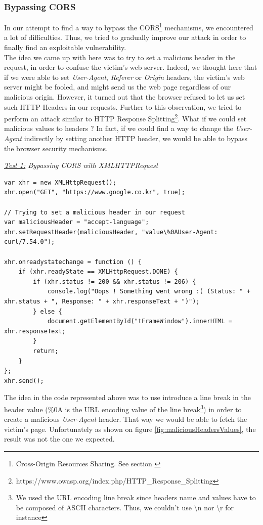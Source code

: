 \documentclass[journal]{IEEEtran}
\begin{document}
\subsubsection*{Bypassing CORS} 

In our attempt to find a way to bypass the CORS\footnote{Cross-Origin Resources Sharing. See section \label{CORSSection}} mechanisms, we encountered a lot of difficulties. Thus, we tried to gradually improve our attack in order to finally find an exploitable vulnerability. \\
The idea we came up with here was to try to set a malicious header in the request, in order to confuse the victim's web server. Indeed, we thought here that if we were able to set \emph{User-Agent}, \emph{Referer} or \emph{Origin} headers, the victim's web server might be fooled, and might send us the web page regardless of our malicious origin. However, it turned out that the browser refused to let us set such HTTP Headers in our requests. Further to this observation, we tried to perform an attack similar to HTTP Response Splitting\footnote{https://www.owasp.org/index.php/HTTP\_Response\_Splitting}. What if we could set malicious values to headers ? In fact, if we could find a way to change the \emph{User-Agent} indirectly by setting another HTTP header, we would be able to bypass the browser security mechanisms.

\medskip

\emph{\underline{Test 1:} Bypassing CORS with XMLHTTPRequest} \\
\begin{lstlisting}[caption=Trying to set malicious headers with XMLHTTPRequest]
var xhr = new XMLHttpRequest();
xhr.open("GET", "https://www.google.co.kr", true);
      
// Trying to set a malicious header in our request
var maliciousHeader = "accept-language";
xhr.setRequestHeader(maliciousHeader, "value\%0AUser-Agent: curl/7.54.0");
      
xhr.onreadystatechange = function () {
    if (xhr.readyState == XMLHttpRequest.DONE) {
        if (xhr.status != 200 && xhr.status != 206) {
            console.log("Oops ! Something went wrong :( (Status: " + xhr.status + ", Response: " + xhr.responseText + ")");
        } else {
            document.getElementById("tFrameWindow").innerHTML = xhr.responseText;
        }
        return;
    }
};
xhr.send();
\end{lstlisting}

The idea in the code represented above was to use introduce a line break in the header value (\%0A is the URL encoding value of the line break\footnote{We used the URL encoding line break since headers name and values have to be composed of ASCII characters. Thus, we couldn't use \textbackslash n nor \textbackslash r for instance}) in order to create a malicious \emph{User-Agent} header. That way we would be able to fetch the victim's page. Unfortunately as shown on figure \ref{fig:maliciousHeadersValues}, the result was not the one we expected.
\end{document}
